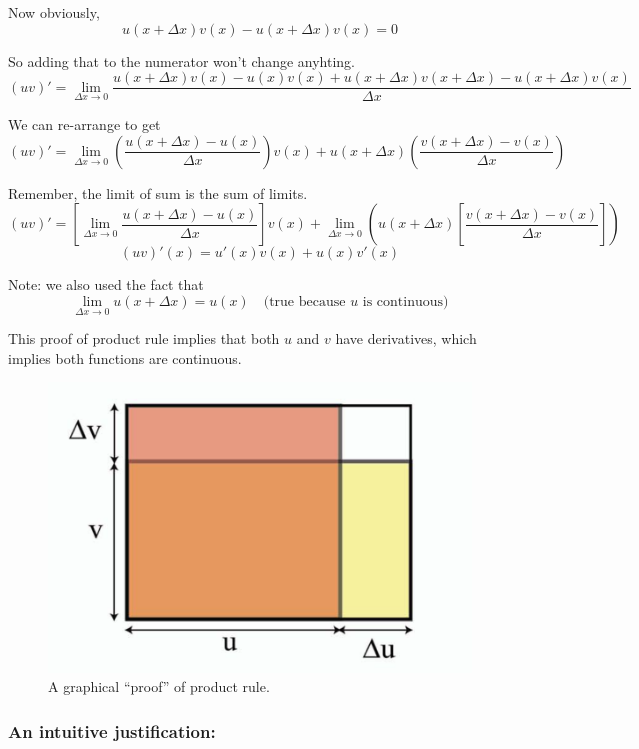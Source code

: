 Now obviously, $$u(x+\Delta x)v(x) - u(x+\Delta x)v(x) = 0$$

So adding that to the numerator won't change anyhting.
$$
(uv)' = \lim_{\Delta x \to 0} 
	\frac{
		u(x+\Delta x)v(x)
		- u(x)v(x)
		+ u(x+\Delta x)v(x+\Delta x)
		- u(x+\Delta x)v(x)
	}{\Delta x}
$$

We can re-arrange to get
$$
(uv)' = \lim_{\Delta x \to 0} 
	\left( \frac{u(x+\Delta x) - u(x)}{\Delta x} \right) v(x) +
	u(x+\Delta x) \left( \frac{v(x+\Delta x) - v(x)}{\Delta x} \right) 
$$

Remember, the limit of sum is the sum of limits.
$$
(uv)' = \left[ \lim_{\Delta x \to 0} \frac{u(x+\Delta x) - u(x)}{\Delta x} \right] v(x) +
	\lim_{\Delta x \to 0} \left( u(x+\Delta x) \left[ \frac{v(x+\Delta x) - v(x)}{\Delta x} \right] \right)
$$
$$(uv)'(x) = u'(x)v(x) + u(x)v'(x)$$

Note: we also used the fact that $$ \lim_{\Delta x \to 0} u(x+\Delta x) = u(x) \quad \text{(true because $u$ is continuous)}$$

This proof of product rule implies that both $u$ and $v$ have derivatives, which implies both functions are continuous.

\begin{figure}[h!]
	\centering
	\includegraphics[scale=0.4]{./images/lecture_3_figure_1.png}
	\caption{A graphical ``proof'' of product rule.}    
\end{figure}

\subsubsection*{An intuitive justification:}

